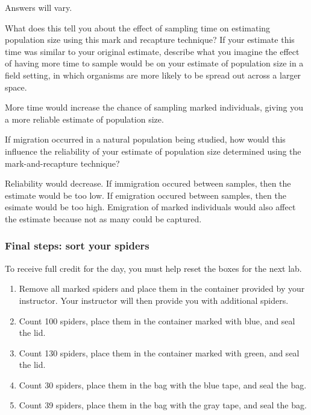\documentclass[12pt, hidelinks]{exam}
\newcommand*\AnswerBox[2]{%
    \parbox[t][#1]{0.92\textwidth}{%
    \begin{solution}#2\end{solution}}
    \vspace{\stretch{1}}
}
\newlength{\basespace}
\begin{document}
\begin{questions}
\AnswerBox{\basespace}{Answers will vary.}

\newpage

\question[Checkout]
What does this tell you about the effect of sampling time on estimating
population size using this mark and recapture technique? If your estimate this time was
similar to your original estimate, describe what you imagine the effect
of having more time to sample would be on your estimate of population
size in a field setting, in which organisms are more likely to be spread
out across a larger space.

\AnswerBox{\basespace}{More time would increase the chance of sampling marked individuals, giving you a more reliable estimate of population size.}


\question[Checkout]
If migration occurred in a natural population being studied, how
would this influence the reliability of your estimate of population size
determined using the mark-and-recapture technique?

\AnswerBox{\basespace}{Reliability would decrease. If immigration occured between samples, then the estimate would be too low. If emigration occured between samples, then the esimate would be too high. Emigration of marked individuals would also affect the estimate because not as many could be captured.}

\subsubsection*{Final steps: sort your spiders}

To receive full credit for the day, you must help reset the boxes for the next lab.

\begin{enumerate}
	\item Remove all marked spiders and place them in the container provided by your instructor. Your instructor will then provide you with additional spiders.
	
	\item Count 100 spiders, place them in the container marked with blue, and seal the lid. 
	
	\item Count 130 spiders, place them in the container marked with green, and seal the lid.
	
	\item Count 30 spiders, place them in the bag with the blue tape, and seal the bag.
	
	\item Count 39 spiders, place them in the bag with the gray tape, and seal the bag.
	

\end{enumerate}
\end{questions}
\end{document}

